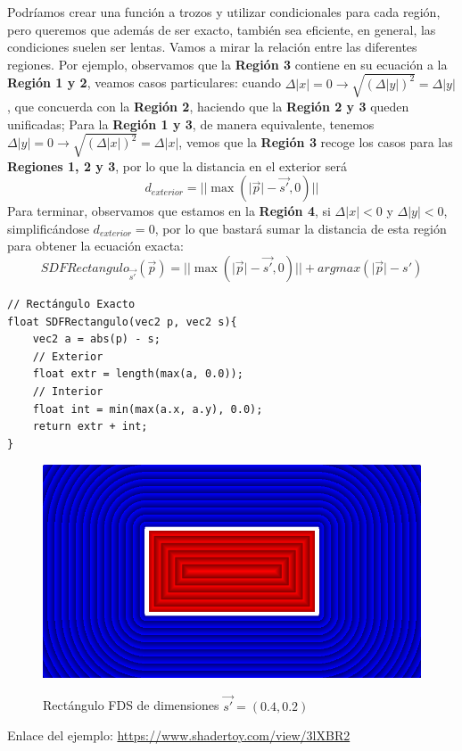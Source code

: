 Podríamos crear una función a trozos y utilizar condicionales para cada región, pero queremos que además de ser exacto, también sea eficiente, en general, las condiciones suelen ser lentas. Vamos a mirar la relación entre las diferentes regiones. Por ejemplo, observamos que la \textbf{Región 3} contiene en su ecuación a la \textbf{Región 1 y 2}, veamos casos particulares: cuando \(\Delta \vert x\vert =0\longrightarrow \sqrt{\left(\Delta\vert y\vert\right)^2} = \Delta \vert y\vert\), que concuerda con la \textbf{Región 2}, haciendo que la \textbf{Región 2 y 3} queden unificadas; Para la \textbf{Región 1 y 3}, de manera equivalente, tenemos \(\Delta \vert y\vert =0\longrightarrow \sqrt{\left(\Delta\vert x\vert\right)^2} = \Delta \vert x\vert\), vemos que la \textbf{Región 3} recoge los casos para las \textbf{Regiones 1, 2 y 3}, por lo que la distancia en el exterior será
\[d_{exterior}=\vert\vert\max\left(\vert\Vec{p}\vert-\Vec{s'},0\right)\vert\vert\]
Para terminar, observamos que estamos en la \textbf{Región 4}, si \(\Delta\vert x\vert< 0 \) y \(\Delta\vert y\vert<0\), simplificándose \(d_{exterior} = 0\), por lo que bastará sumar la distancia de esta región para obtener la ecuación exacta:
\[SDFRectangulo_{\Vec{s'}}(\Vec{p})= \vert\vert\max\left(\vert\Vec{p}\vert-\Vec{s'},0\right)\vert\vert + argmax(\vert \Vec{p}\vert - {s'})\]
\begin{lstlisting}
// Rectángulo Exacto
float SDFRectangulo(vec2 p, vec2 s){
    vec2 a = abs(p) - s;
    // Exterior
    float extr = length(max(a, 0.0));
    // Interior
    float int = min(max(a.x, a.y), 0.0);
    return extr + int;
}
\end{lstlisting}
\begin{figure}[H]
  \centering
  \captionsetup{justification=centering}%
  \includegraphics[width=1.0\textwidth]{secciones/imagenes/sdf/2d/sdf_rectangulo.png}\label{fig:rectaangulo}
  \caption{Rectángulo FDS de dimensiones \(\Vec{s'}=(0.4, 0.2)\)}
\end{figure}
Enlace del ejemplo: \url{https://www.shadertoy.com/view/3lXBR2}

